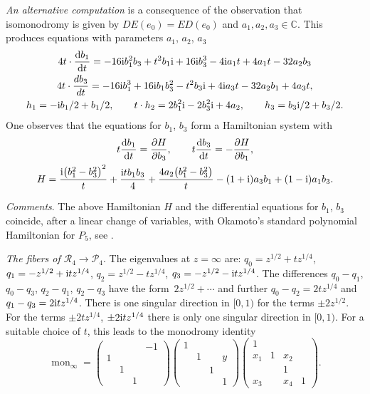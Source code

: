 \documentclass[pdftex]{sigma}
\numberwithin{equation}{section}
\begin{document}
{\it An alternative computation} is a consequence of the observation that isomonodromy is given by
 $ DE(e_0)=ED(e_0)$ and $a_1,a_2,a_3 \in \mathbb{C}$. This produces equations with
 parameters $a_1$, $a_2$, $a_3$
 \begin{gather*}
 4t\cdot \frac{{\rm d}b_1}{{\rm d}t} = -16{\rm i}b_1^2b_3 + t^2b_1{\rm i} + 16{\rm i}b_3^3 - 4{\rm i}a_1t + 4a_1t - 32a_2b_3\\
 4t\cdot \frac{db_3}{dt} = -16{\rm i}b_1^3 + 16{\rm i}b_1b_3^2 - t^2b_3{\rm i} + 4{\rm i}a_3t - 32a_2b_1 + 4a_3t,\\
 h_1 = -{\rm i}b_1/2 + b_1/2, \qquad t\cdot h_2 = 2b_1^2{\rm i} - 2b_3^2{\rm i} + 4a_2,\qquad h_3 = b_3{\rm i}/2 + b_3/2. \end{gather*}
 One observes that the equations for $b_1$, $b_3$ form a Hamiltonian system with
 \begin{gather*}
 t\frac{{\rm d}b_1}{{\rm d}t}=\frac{\partial H}{\partial b_3},\qquad t\frac{{\rm d}b_3}{{\rm d}t}=-\frac{\partial H }{\partial b_1},\\
H=\frac{{\rm i}\bigl(b_1^2-b_3^2\bigr)^2}{t}+\frac{{\rm i}tb_1b_3}{4}+\frac{4a_2\bigl(b_1^2-b_3^2\bigr)}{t}-(1+{\rm i})a_3b_1+(1-{\rm i})a_1b_3.\end{gather*}

{\it Comments}.
The above Hamiltonian $H$ and the differential equations for $b_1$, $b_3$ coincide, after a linear change of variables,
with Okamoto's standard polynomial Hamiltonian for $P_5$, see \cite[p.~265]{O1}.


{\it The fibers of $\mathcal{R}_4\rightarrow \mathcal{P}_4$}. The eigenvalues at $z=\infty$ are:
$q_0=z^{1/2}+tz^{1/4}$, $q_1=-z^{1/2}+{\rm i}tz^{1/4}$, $q_2=z^{1/2}-tz^{1/4}$, $q_3=-z^{1/2}-{\rm i}tz^{1/4}$.
 The differences $q_0-q_1$, $ q_0-q_3$, $ q_2-q_1$, $ q_2-q_3$ have the form~${2z^{1/2}+\cdots}$ and further
 $q_0-q_2=2tz^{1/4}$ and $q_1-q_3=2{\rm i}tz^{1/4}$. There is one singular direction in $[0,1)$ for the terms
 $\pm 2z^{1/2}$. For the terms $\pm 2tz^{1/4}$, $\pm 2{\rm i}tz^{1/4}$ there is only one singular direction in $[0,1)$.
 For a suitable choice of $t$, this leads to the monodromy identity
 \[\operatorname{mon}_\infty= \begin{pmatrix} & & &-1 \\ 1& & & \\ & 1& & \\ & &1 & \end{pmatrix} \begin{pmatrix} 1 & & & \\ & 1& &y \\ & &1 & \\ & & & 1\end{pmatrix}
\begin{pmatrix} 1 & & & \\ x_1&1 &x_2 & \\ & & 1& \\ x_3& &x_4 & 1\end{pmatrix}. \]
\end{document}
